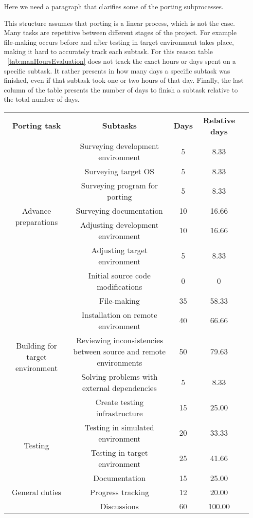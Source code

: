 Here we need a paragraph that clarifies some of the porting subprocesses.

This structure assumes that porting is a linear process, which is not the case.
Many tasks are repetitive between different stages of the project. For example
file-making occurs before and after testing in target environment takes place,
making it hard to accurately track each subtask. For this reason table
~\ref{tab:manHoursEvaluation} does not track the exact hours or days spent
on a specific subtask. It rather presents in how many days a specific subtask
was finished, even if that subtask took one or two hours of that day. Finally,
the last column of the table presents the number of days to finish a subtask
relative to the total number of days.

\begin{table*}
\centering
\begin{tabular}{ |c|c|c|c|c| }
\hline
Porting task & Subtasks & Days & Relative days \\
\hline
\multirow{7}{5em}{Advance preparations} & Surveying development environment & 5 & 8.33\\
& Surveying target OS & 5 & 8.33 \\
& Surveying program for porting & 5 & 8.33 \\
& Surveying documentation & 10 & 16.66 \\
& Adjusting development environment & 10 & 16.66 \\
& Adjusting target environment & 5 & 8.33 \\
& Initial source code modifications & 0 & 0 \\
\hline
\multirow{5}{5em}{Building for target environment} & File-making & 35  & 58.33\\
& Installation on remote environment & 40 & 66.66 \\
& Reviewing inconsistencies between source and remote environments & 50 & 79.63 \\
& Solving problems with external dependencies & 5 & 8.33 \\
& Create testing infrastructure & 15 & 25.00 \\
\hline
\multirow{2}{5em}{Testing} & Testing in simulated environment & 20  & 33.33\\
& Testing in target environment & 25 & 41.66 \\
\hline
\multirow{3}{5em}{General duties} & Documentation & 15  & 25.00 \\
& Progress tracking & 12 & 20.00 \\
& Discussions & 60 & 100.00 \\
\hline
\end{tabular}
\caption{Man-days evaluation for porting tasks}
\label{tab:manHoursEvaluation}
\end{table*}

